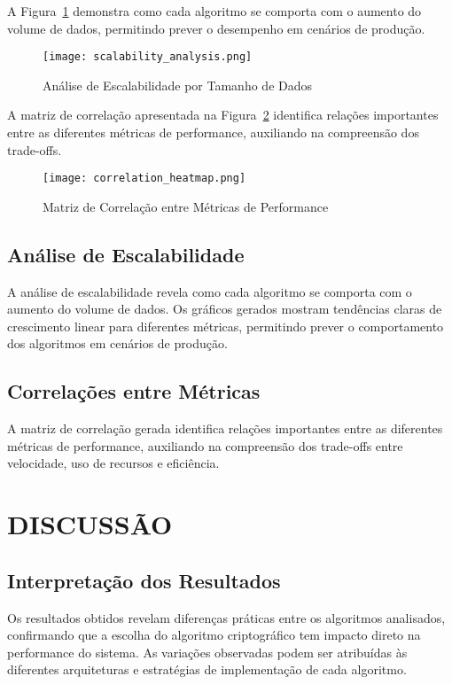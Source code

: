 \documentclass[12pt,a4paper,oneside]{article}
\begin{document}
A Figura~\ref{fig:scalability} demonstra como cada algoritmo se comporta com o aumento do volume de dados, permitindo prever o desempenho em cenários de produção.

\begin{figure}[H]
\centering
\texttt{[image: scalability\_analysis.png]}
\caption{Análise de Escalabilidade por Tamanho de Dados}
\label{fig:scalability}
\end{figure}

A matriz de correlação apresentada na Figura~\ref{fig:correlation} identifica relações importantes entre as diferentes métricas de performance, auxiliando na compreensão dos trade-offs.

\begin{figure}[H]
\centering
\texttt{[image: correlation\_heatmap.png]}
\caption{Matriz de Correlação entre Métricas de Performance}
\label{fig:correlation}
\end{figure}

\subsection{Análise de Escalabilidade}

A análise de escalabilidade revela como cada algoritmo se comporta com o aumento do volume de dados. Os gráficos gerados mostram tendências claras de crescimento linear para diferentes métricas, permitindo prever o comportamento dos algoritmos em cenários de produção.

\subsection{Correlações entre Métricas}

A matriz de correlação gerada identifica relações importantes entre as diferentes métricas de performance, auxiliando na compreensão dos trade-offs entre velocidade, uso de recursos e eficiência.

\section{DISCUSSÃO}

\subsection{Interpretação dos Resultados}

Os resultados obtidos revelam diferenças práticas entre os algoritmos analisados, confirmando que a escolha do algoritmo criptográfico tem impacto direto na performance do sistema. As variações observadas podem ser atribuídas às diferentes arquiteturas e estratégias de implementação de cada algoritmo.
\end{document}
